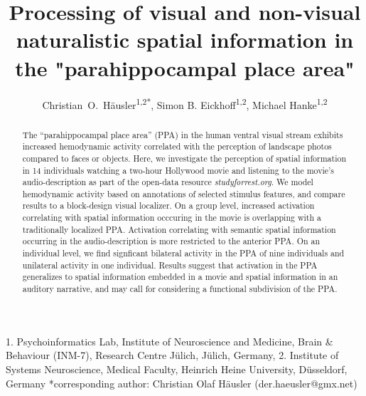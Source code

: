 \documentclass[english]{article}
\begin{document}




\title{Processing of visual and non-visual naturalistic spatial information in
  the "parahippocampal place area"}

\author{
    Christian~O.~Häusler\textsuperscript{1,2{*}},
    Simon B. Eickhoff\textsuperscript{1,2},
    Michael Hanke\textsuperscript{1,2}}

\maketitle
\thispagestyle{fancy}

1. Psychoinformatics Lab, Institute of Neuroscience and Medicine, Brain \&
Behaviour (INM-7), Research Centre Jülich, Jülich, Germany, 2. Institute of
Systems Neuroscience, Medical Faculty, Heinrich Heine University,  Düsseldorf,
Germany {*}corresponding author: Christian Olaf Häusler (der.haeusler@gmx.net)


\begin{abstract}
The ``parahippocampal place area'' (PPA) in the human ventral visual stream
exhibits increased hemodynamic activity correlated with the perception of
landscape photos compared to faces or objects.
Here, we investigate the perception of spatial information in 14 individuals
watching a two-hour Hollywood movie and listening to the movie's
audio-description as part of the open-data resource \textit{studyforrest.org}.
We model hemodynamic activity based on annotations of selected stimulus
features,
and compare results to a block-design visual localizer.
On a group level, increased activation correlating with spatial information
occcuring in the movie is overlapping with a traditionally localized PPA.
Activation correlating with semantic spatial information occurring in the
audio-description is more restricted to the anterior PPA.
On an individual level, we find signficant bilateral activity in the PPA
of nine individuals and unilateral activity in one individual.
Results suggest that activation in the PPA generalizes to spatial information
embedded in a movie and spatial information in an auditory narrative, and may
call for considering a functional subdivision of the PPA.  \end{abstract}
\end{document}
